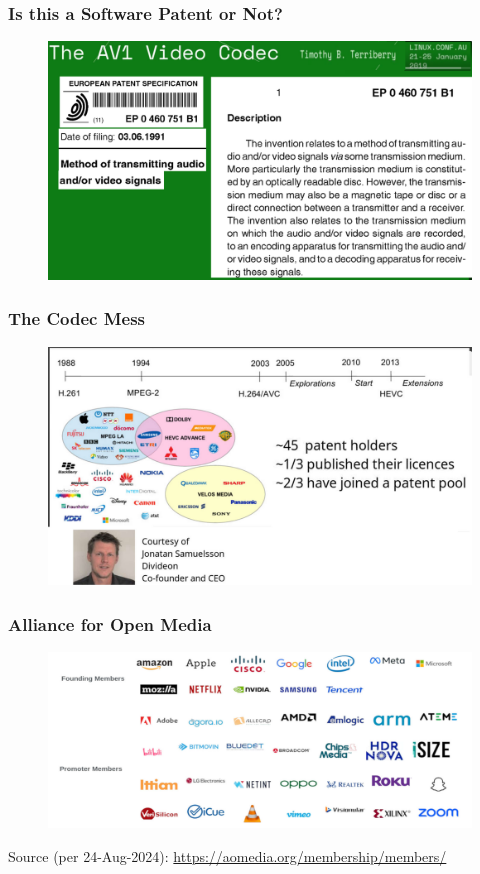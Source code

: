 \documentclass[aspectratio=169, xcolor=table, notheorems, hyperref={pdfpagelabels=false}]{beamer}
\begin{document}
\begin{frame}
\frametitle{Is this a Software Patent or Not?}
\begin{figure}
\includegraphics[width=0.75\linewidth]{os01-avw}
\end{figure}
\end{frame}

\begin{frame}
\frametitle{The Codec Mess}
\begin{figure}
\includegraphics[width=0.75\linewidth]{os01-avx}
\end{figure}
\end{frame}

\begin{frame}
\frametitle{Alliance for Open Media}
\begin{figure}
\includegraphics[width=0.99\linewidth]{os01-avy}
\end{figure}
{\small Source (per 24-Aug-2024): \url{https://aomedia.org/membership/members/}}
\end{frame}
\end{document}
